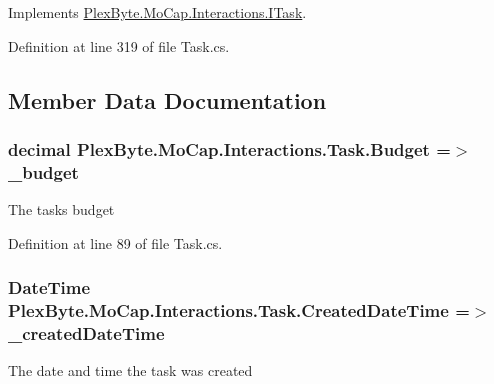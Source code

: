 Implements \hyperlink{interface_plex_byte_1_1_mo_cap_1_1_interactions_1_1_i_task_a7e385a390973b7cc165bfbb6caf9ed75}{Plex\+Byte.\+Mo\+Cap.\+Interactions.\+I\+Task}.



Definition at line 319 of file Task.\+cs.



\subsection{Member Data Documentation}
\subsubsection[{\texorpdfstring{Budget}{Budget}}]{\setlength{\rightskip}{0pt plus 5cm}decimal Plex\+Byte.\+Mo\+Cap.\+Interactions.\+Task.\+Budget =$>$ \+\_\+budget}\hypertarget{class_plex_byte_1_1_mo_cap_1_1_interactions_1_1_task_a754524cdae030db2de7d38cae665ed7e}{}\label{class_plex_byte_1_1_mo_cap_1_1_interactions_1_1_task_a754524cdae030db2de7d38cae665ed7e}


The tasks budget 



Definition at line 89 of file Task.\+cs.

\subsubsection[{\texorpdfstring{Created\+Date\+Time}{CreatedDateTime}}]{\setlength{\rightskip}{0pt plus 5cm}Date\+Time Plex\+Byte.\+Mo\+Cap.\+Interactions.\+Task.\+Created\+Date\+Time =$>$ \+\_\+created\+Date\+Time}\hypertarget{class_plex_byte_1_1_mo_cap_1_1_interactions_1_1_task_ad09e75c883291d7bf2a5be651c2e48f5}{}\label{class_plex_byte_1_1_mo_cap_1_1_interactions_1_1_task_ad09e75c883291d7bf2a5be651c2e48f5}


The date and time the task was created 



